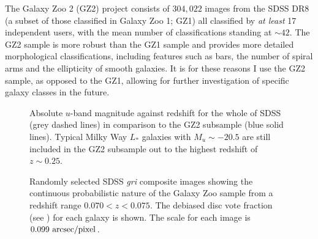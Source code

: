 The Galaxy Zoo 2 (GZ2) project consists of $304, 022$ images from the SDSS DR8 (a subset of those classified in Galaxy Zoo 1; GZ1) all classified by \emph{at least} 17 independent users, with the mean number of classifications standing at $\sim42$. The GZ2 sample is more robust than the GZ1 sample and provides more detailed morphological classifications, including features such as bars, the number of spiral arms and the ellipticity of smooth galaxies. It is for these reasons I use the GZ2 sample, as opposed to the GZ1, allowing for further investigation of specific galaxy classes in the future. 

\begin{figure}
\caption[GZ2-GALEX sample completeness]{Absolute $u$-band magnitude against redshift for the whole of SDSS (grey dashed lines) in comparison to the GZ2 subsample (blue solid lines). Typical Milky Way $L_*$ galaxies with $M_u \sim -20.5$ are still included in the GZ2 subsample out to the highest redshift of $z \sim 0.25$.}
\label{complete}
\end{figure}

\begin{figure}
\caption[Example SDSS images with GZ2 vote fractions]{Randomly selected SDSS \emph{gri} composite images showing the continuous probabilistic nature of the Galaxy Zoo sample from a redshift range $0.070 < z < 0.075$. The debiased disc vote fraction (see \citealt{GZ2}) for each galaxy is shown. The scale for each image is $0.099~\rm{arcsec/pixel}$.}
\label{mosaic}
\end{figure}



